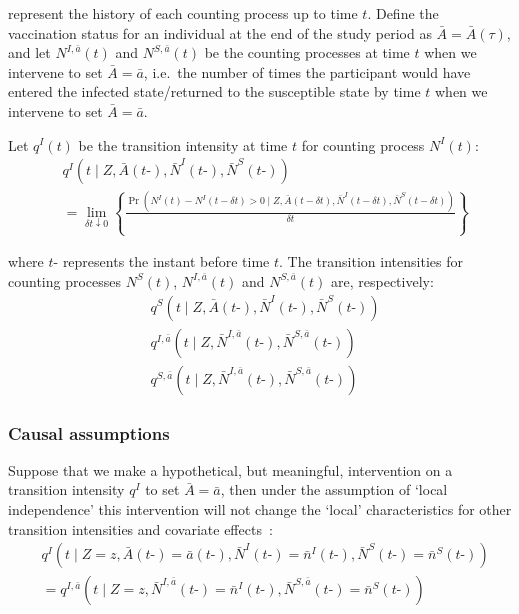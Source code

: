 represent the history of each counting process up to time $t$. Define the vaccination status for an individual at the end of the study period as $\bar{A} = \bar{A}(\tau)$, and let $N^{I,\bar{a}}(t)$ and $N^{S,\bar{a}}(t)$ be the counting processes at time $t$ when we intervene to set $\bar{A} = \bar{a}$, i.e.\ the number of times the participant would have entered the infected state/returned to the susceptible state by time $t$ when we intervene to set $\bar{A} = \bar{a}$.

Let $q^I(t)$ be the transition intensity at time $t$ for counting process $N^I(t)$:
%
\begin{align*}
     & q^I(t \mid Z, \bar{A} (t \mbox{-}), \bar{N}^I (t \mbox{-}), \bar{N}^S (t \mbox{-}))                                                                                    \\
     & = \lim_{\delta t \downarrow 0} \left\{\frac{\Pr\left(N^{I}(t) - N^{I}(t - \delta t) > 0 \mid Z, \bar{A} (t - \delta t), \bar{N}^I (t - \delta t), \bar{N}^S (t - \delta t)\right)}{\delta t}\right\}
\end{align*}

where $t\mbox{-}$ represents the instant before time $t$. The transition intensities for counting processes $N^S(t)$, $N^{I,\bar{a}}(t)$ and $N^{S,\bar{a}}(t)$ are, respectively:
%
\begin{align*}
     & q^S(t \mid Z, \bar{A} (t \mbox{-}), \bar{N}^I (t \mbox{-}), \bar{N}^S (t \mbox{-}))            \\
     & q^{I, \bar{a}}(t \mid Z, \bar{N}^{I, \bar{a}} (t \mbox{-}), \bar{N}^{S, \bar{a}} (t \mbox{-})) \\
     & q^{S, \bar{a}}(t \mid Z, \bar{N}^{I, \bar{a}} (t \mbox{-}), \bar{N}^{S, \bar{a}} (t \mbox{-}))
\end{align*}

\subsubsection{Causal assumptions}

Suppose that we make a hypothetical, but meaningful, intervention on a transition intensity $q^{I}$ to set $\bar{A} = \bar{a}$, then under the assumption of `local independence' this intervention will not change the `local' characteristics for other transition intensities and covariate effects~\parencite{Seaman2023-rs, Ryalen2019-it}:
%
\begin{align*}
     & q^I (t \mid Z = z, \bar{A} (t \mbox{-}) = \bar{a} (t \mbox{-}), \bar{N}^I (t \mbox{-}) = \bar{n}^I (t \mbox{-}), \bar{N}^S (t \mbox{-}) = \bar{n}^S (t \mbox{-})) \\
     & = q^{I, \bar{a}} (t \mid Z = z, \bar{N}^{I, \bar{a}} (t \mbox{-}) = \bar{n}^I (t \mbox{-}), \bar{N}^{S, \bar{a}} (t \mbox{-}) = \bar{n}^S (t \mbox{-}))
\end{align*}

